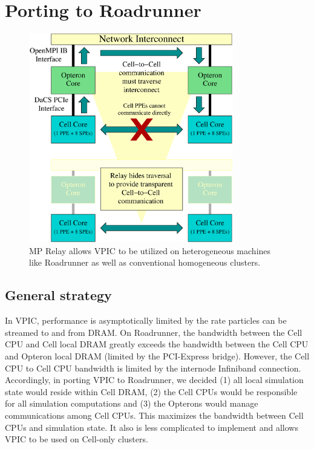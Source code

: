 \documentclass[journal,twoside]{IEEEtran}
\begin{document}
\section{Porting to Roadrunner}

\begin{figure}
\begin{center}
\includegraphics[width=3.5in]{figs/relay.eps}
\caption{MP Relay allows VPIC to be utilized on heterogeneous
machines like Roadrunner as well as conventional homogeneous
clusters.}
\label{fig:relay}
\end{center}
\end{figure}

\subsection{General strategy}

In VPIC, performance is asymptotically limited by the rate particles
can be streamed to and from DRAM.  On Roadrunner, the bandwidth
between the Cell CPU and Cell local DRAM greatly exceeds the bandwidth
between the Cell CPU and Opteron local DRAM (limited by the
PCI-Express bridge).  However, the Cell CPU to Cell CPU bandwidth is
limited by the internode Infiniband connection.  Accordingly, in
porting VPIC to Roadrunner, we decided (1) all local simulation state
would reside within Cell DRAM, (2) the Cell CPUs would be responsible
for all simulation computations and (3) the Opterons would manage
communications among Cell CPUs.  This maximizes the bandwidth between
Cell CPUs and simulation state.  It also is less complicated to
implement and allows VPIC to be used on Cell-only clusters.
\end{document}
